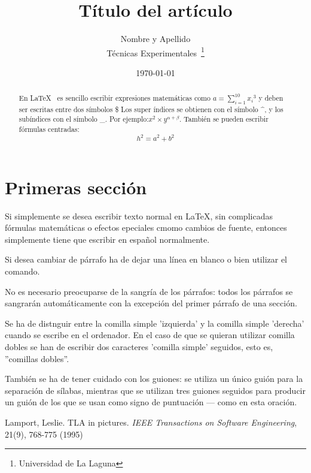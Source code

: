 \documentclass[a4paper,12pt]{article}
\begin{document}
\title{Título del artículo}
\author{Nombre y Apellido \\
	Técnicas Experimentales~\footnote{Universidad de La Laguna}
	}
\date{\today}
\maketitle
\begin{abstract}
  En \LaTeX{}~\cite{Lam:86} es sencillo escribir expresiones
  matemáticas como $a=\sum_{i=1}^{10} {x_i}^{3}$
  y deben ser escritas entre dos símbolos \$
  Los super índices se obtienen con el símbolo \^{}, y
  los subíndices con el símbolo \_.
  Por ejemplo:$x^2 \times y^{\alpha + \beta}$.
  También se pueden escribir fórmulas centradas:
  \[h^2=a^2 + b^2 \]
\end{abstract}

\section{Primeras sección}
Si simplemente se desea escribir texto normal en \LaTeX{}, 
sin complicadas f\'ormulas matem\'aticas o efectos epeciales
cmomo cambios de fuente, entonces simplemente tiene que escribir
en espa\~nol normalmente.\par
Si desea cambiar de párrafo ha de dejar una línea en blanco o bien
utilizar el comando.\par
No es necesario preocuparse de la sangría de los párrafos:
todos los párrafos se sangrarán automáticamente con la excepción
del primer párrafo de una sección.

Se ha de distnguir entre la comilla simple 'izquierda'
y la comilla simple 'derecha' cuando se escribe en el ordenador.
En el caso de que se quieran utilizar co\-mi\-lla dobles se han de
escribir dos caracteres 'comilla simple' seguidos, esto es, 
''comillas dobles''.

También se ha de tener cuidado con los guiones: se utiliza un único
guión para la separación de sílabas, mientras que se utilizan
tres guiones seguidos para producir un guión de los que se usan
como signo de puntuación --- como en esta oración.
\begin{thebibliography}{00}
    Lamport, Leslie.
    TLA in pictures.
    \emph{IEEE Transactions on Software Engineering},
    21(9), 768-775
    (1995)
\end{thebibliography}
\end{document}
